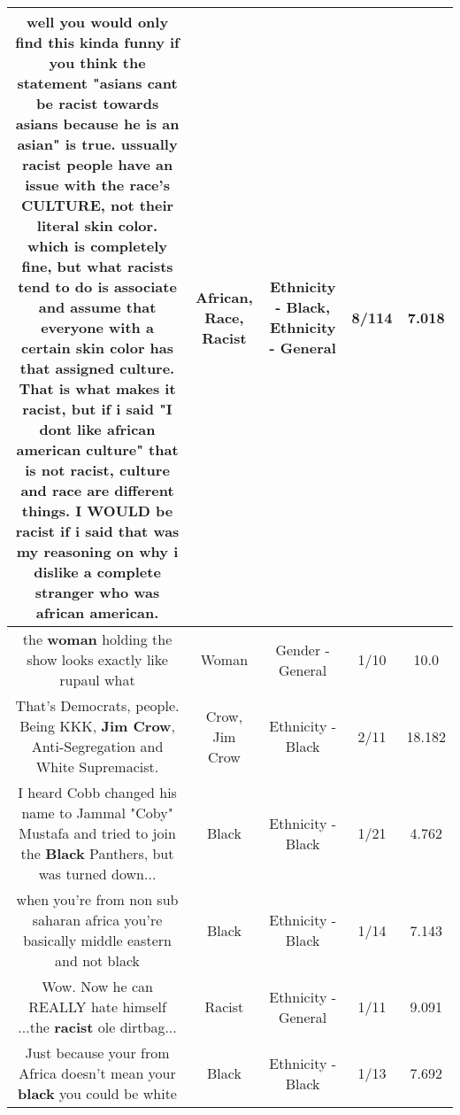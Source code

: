\documentclass[11pt]{article}
\newlength\mylength
\begin{document}
\begin{center}
\begin{longtable}{|C{.65\mylength}|C{.30\mylength}|C{.12\mylength}|C{.12\mylength}|C{.12\mylength}|}
  \small well you would only find this kinda funny if you think the statement "asians cant be \textbf{racist} towards asians because he is an asian" is true. ussually \textbf{racist} people have an issue with the \textbf{race}'s CULTURE, not their literal skin color. which is completely fine, but what racists tend to do is associate and assume that everyone with a certain skin color has that assigned culture. That is what makes it \textbf{racist}, but if i said "I dont like \textbf{african} american culture" that is not \textbf{racist}, culture and \textbf{race} are different things. I WOULD be \textbf{racist} if i said that was my reasoning on why i dislike a complete stranger who was \textbf{african} american.\normalsize   & African, Race, Racist & Ethnicity - Black, Ethnicity - General & 8/114 & 7.018 \\  \hline
  \small the \textbf{woman} holding the show looks exactly like rupaul what\normalsize   & Woman & Gender - General & 1/10 & 10.0 \\  \hline
  \small That's Democrats, people. Being KKK, \textbf{Jim C\textbf{row}}, Anti-Segregation and White Supremacist.\normalsize   & Crow, Jim Crow & Ethnicity - Black & 2/11 & 18.182 \\  \hline
  \small I heard Cobb changed his name to Jammal "Coby" Mustafa and tried to join the \textbf{Black} Panthers, but was turned down...\normalsize   & Black & Ethnicity - Black & 1/21 & 4.762 \\  \hline
  \small when you're from non sub saharan africa you're basically middle eastern and not black\normalsize   & Black & Ethnicity - Black & 1/14 & 7.143 \\  \hline
  \small Wow. Now he can REALLY hate himself ...the \textbf{racist} ole dirtbag...\normalsize   & Racist & Ethnicity - General & 1/11 & 9.091 \\  \hline
  \small Just because your from Africa doesn't mean your \textbf{black} you could be white\normalsize   & Black & Ethnicity - Black & 1/13 & 7.692 \\  \hline

\end{longtable}
\end{center}
\end{document}
